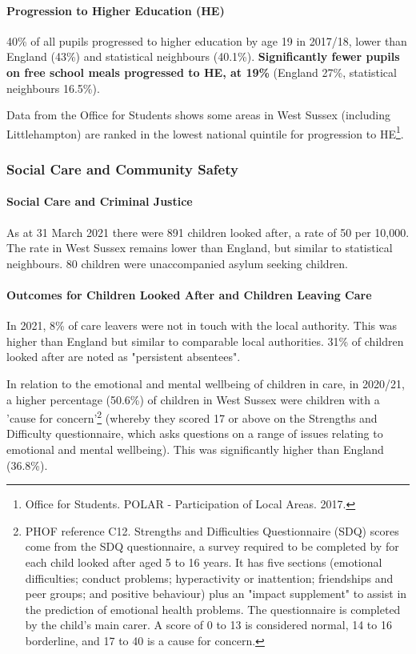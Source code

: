 \paragraph{Progression to Higher Education (HE)} 40\% of all pupils progressed to higher education by age 19 in 2017/18, lower than England (43\%) and statistical neighbours (40.1\%). {\bfseries Significantly fewer pupils on free school meals progressed to HE, at 19\%} (England 27\%, statistical neighbours 16.5\%).

Data from the Office for Students shows some areas in West Sussex (including Littlehampton) are ranked in the lowest national quintile for progression to HE\footnote{Office for Students. POLAR - Participation of Local Areas. 2017.}.

\subsubsection{Social Care and Community Safety}
\paragraph{Social Care and Criminal Justice}

As at 31 March 2021 there were 891 children looked after, a rate of 50 per 10,000. The rate in West Sussex remains lower than England, but similar to statistical neighbours. 80 children were unaccompanied asylum seeking children.

\paragraph{Outcomes for Children Looked After and Children Leaving Care}
In 2021, 8\% of care leavers were not in touch with the local authority. This was higher than England but similar to comparable local authorities. 31\% of children looked after are noted as "persistent absentees".

In relation to the emotional and mental wellbeing of children in care, in 2020/21, a higher percentage (50.6\%) of children in West Sussex were children with a 'cause for concern'\footnote{PHOF reference C12. Strengths and Difficulties Questionnaire (SDQ) scores come from the SDQ questionnaire, a survey required to be completed by for each child looked after aged 5 to 16 years. It has five sections (emotional difficulties; conduct problems; hyperactivity or inattention; friendships and peer groups; and positive behaviour) plus an "impact supplement" to assist in the prediction of emotional health problems. The questionnaire is completed by the child's main carer. A score of 0 to 13 is considered normal, 14 to 16 borderline, and 17 to 40 is a cause for concern.} (whereby they scored 17 or above on the Strengths and Difficulty questionnaire, which asks questions on a range of issues relating to emotional and mental wellbeing). This was significantly higher than England (36.8\%).

